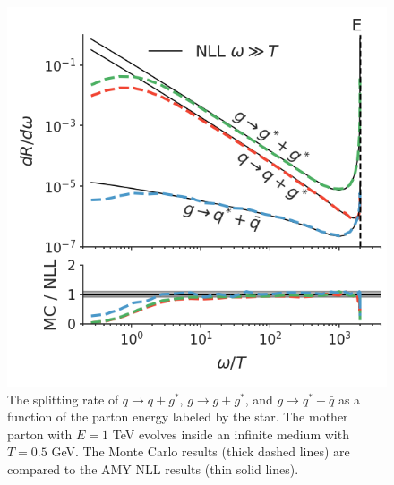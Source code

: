 \documentclass[aps, prc, reprint, amsmath, groupedaddress, nofootinbib]{revtex4-1}
\begin{document}
\begin{figure}
\includegraphics[width=\columnwidth]{channel_rate.png}
\caption{The splitting rate of $q\rightarrow q+g^*$, $g\rightarrow g+g^*$, and $g\rightarrow q^* + \bar{q}$ as a function of the parton energy labeled by the star. The mother parton with $E=1$ TeV evolves inside an infinite medium with $T=0.5$ GeV. The Monte Carlo results (thick dashed lines) are compared to the AMY NLL results (thin solid lines).}
\label{fig:channel_rate}
\end{figure}
\end{document}
